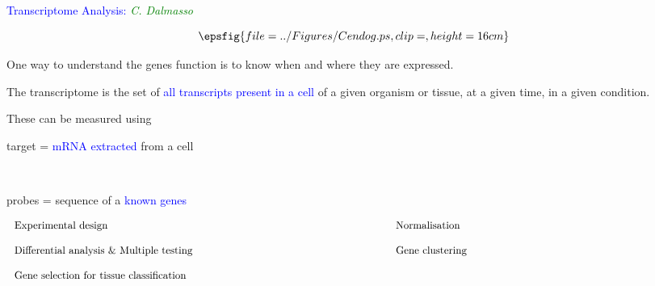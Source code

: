 \documentclass[dvips, lscape]{foils}
\newcommand{\textblue}[1]{\textcolor{blue}{#1}}
\newcommand{\textgreen}[1]{\textcolor{green}{ #1}}
\newcommand{\refer}[2]{\textgreen{\sl #1}}
\newcommand{\emphase}[1]{\textblue{#1}}
\newcommand{\section}[1]{
  \addtocounter{section}{1}
  \setcounter{subsection}{0}
  {\centerline{\Large \textblue{#1}}}
  }
\newcommand{\subsection}[1]{
  \addtocounter{subsection}{1}
  {\noindent{\large \textblue{#1}}}
  }
\newcommand{\paragraph}[1]{\noindent{\textblue{#1}}}
\begin{document}
\newpage
\section{Transcriptome Analysis: \refer{C. Dalmasso}{}}
\vspace{-1cm}
$$
\epsfig{file = ../Figures/Cendog.ps, clip=, height=16cm}
$$

\newpage
\subsection{Functional genomics}

\noindent One way to understand the genes function is to know when and where
they are expressed.

\paragraph{Transcriptome.} The transcriptome is the set of \emphase{all
  transcripts present in a cell} of a given organism or tissue, at a
given time, in a given condition.

\paragraph{Transcriptomic chips.} These can be measured using \\
\centerline{target = \emphase{mRNA extracted} from a cell} \\
\centerline{probes = sequence of a \emphase{known genes}}

\bigskip\bigskip\bigskip
\subsection{Some typical questions}
$$
\begin{tabular}{p{12cm}cp{10cm}}
  Experimental design  & \quad & Normalisation \\
  \\
  Differential analysis \& Multiple testing & & Gene clustering \\
  \\
  Gene selection for tissue classification
\end{tabular}
$$
\end{document}
